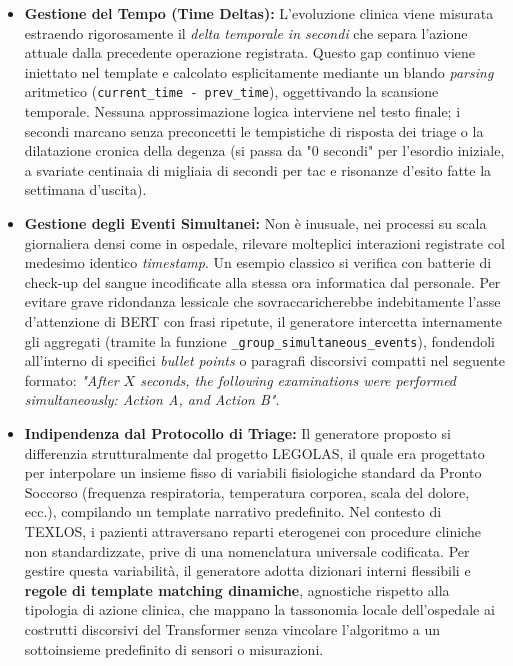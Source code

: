 \begin{itemize}
    \item \textbf{Gestione del Tempo (Time Deltas):} L'evoluzione clinica viene misurata estraendo rigorosamente il \textit{delta temporale in secondi} che separa l'azione attuale dalla precedente operazione registrata. Questo gap continuo viene iniettato nel template e calcolato esplicitamente mediante un blando \textit{parsing} aritmetico (\texttt{current\_time - prev\_time}), oggettivando la scansione temporale. Nessuna approssimazione logica interviene nel testo finale; i secondi marcano senza preconcetti le tempistiche di risposta dei triage o la dilatazione cronica della degenza (si passa da "0 secondi" per l'esordio iniziale, a svariate centinaia di migliaia di secondi per tac e risonanze d'esito fatte la settimana d'uscita).
    \item \textbf{Gestione degli Eventi Simultanei:} Non è inusuale, nei processi su scala giornaliera densi come in ospedale, rilevare molteplici interazioni registrate col medesimo identico \textit{timestamp}. Un esempio classico si verifica con batterie di check-up del sangue incodificate alla stessa ora informatica dal personale. Per evitare grave ridondanza lessicale che sovraccaricherebbe indebitamente l'asse d'attenzione di BERT con frasi ripetute, il generatore intercetta internamente gli aggregati (tramite la funzione \texttt{\_group\_simultaneous\_events}), fondendoli all'interno di specifici \textit{bullet points} o paragrafi discorsivi compatti nel seguente formato: \textit{"After $X$ seconds, the following examinations were performed simultaneously: Action A, and Action B"}.
    \item \textbf{Indipendenza dal Protocollo di Triage:} Il generatore proposto si differenzia strutturalmente dal progetto LEGOLAS, il quale era progettato per interpolare un insieme fisso di variabili fisiologiche standard da Pronto Soccorso (frequenza respiratoria, temperatura corporea, scala del dolore, ecc.), compilando un template narrativo predefinito. Nel contesto di TEXLOS, i pazienti attraversano reparti eterogenei con procedure cliniche non standardizzate, prive di una nomenclatura universale codificata. Per gestire questa variabilità, il generatore adotta dizionari interni flessibili e \textbf{regole di template matching dinamiche}, agnostiche rispetto alla tipologia di azione clinica, che mappano la tassonomia locale dell'ospedale ai costrutti discorsivi del Transformer senza vincolare l'algoritmo a un sottoinsieme predefinito di sensori o misurazioni.
\end{itemize}

